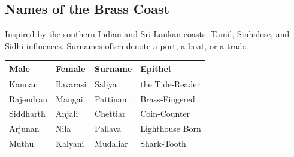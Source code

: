 \documentclass[11pt]{book}
\begin{document}
\subsection*{Names of the Brass Coast}
Inspired by the southern Indian and Sri Lankan coasts: Tamil, Sinhalese, and Sidhi influences. Surnames often denote a port, a boat, or a trade.

\begin{longtable}{|p{}|p{}|p{}|p{}|}
\hline
\textbf{Male} & \textbf{Female} & \textbf{Surname} & \textbf{Epithet} \\
\hline
Kannan & Ilavarasi & Saliya & the Tide‑Reader \\
\hline
Rajendran & Mangai & Pattinam & Brass‑Fingered \\
\hline
Siddharth & Anjali & Chettiar & Coin‑Counter \\
\hline
Arjunan & Nila & Pallava & Lighthouse Born \\
\hline
Muthu & Kalyani & Mudaliar & Shark‑Tooth \\
\hline
\end{longtable}
\end{document}
